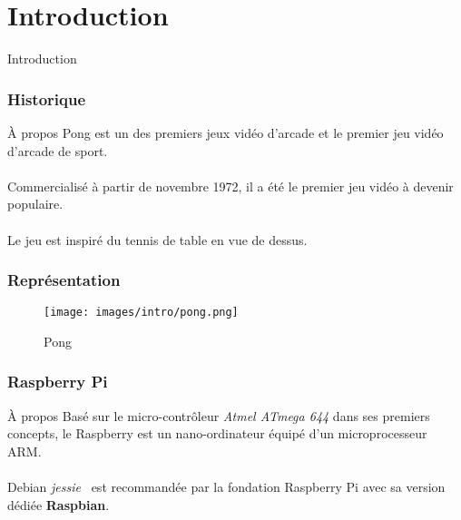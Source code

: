 \section{Introduction}
    
    \begin{frame}
        
        \begin{center}
            \huge{Introduction}
        \end{center}
        
    \end{frame}
    
    \begin{frame}
        \frametitle{Historique}
        \begin{block}{À propos}
            Pong est un des premiers jeux vidéo d'arcade et le premier jeu vidéo d'arcade de sport. \\
            ~\\
            Commercialisé à partir de novembre 1972, il a été le premier jeu vidéo à devenir populaire. \\ %
            ~\\
            Le jeu est inspiré du tennis de table en vue de dessus.
        \end{block}
        
    \end{frame}
    
    \begin{frame}
        \frametitle{Représentation}
        \begin{figure}[h]
            \centering
            \texttt{[image: images/intro/pong.png]}
            \caption{Pong}
        \end{figure}
    \end{frame}
    
    \begin{frame}
        \frametitle{Raspberry Pi}
        \begin{block}{À propos}
            Basé sur le micro-contrôleur \textit{Atmel ATmega 644} dans ses premiers concepts, le Raspberry est un nano-ordinateur équipé d'un microprocesseur ARM. \\
            ~\\
            Debian \og \textit{jessie} \fg\ est recommandée par la fondation Raspberry Pi avec sa version dédiée \textbf{Raspbian}.
        \end{block}
        
    \end{frame}
    
